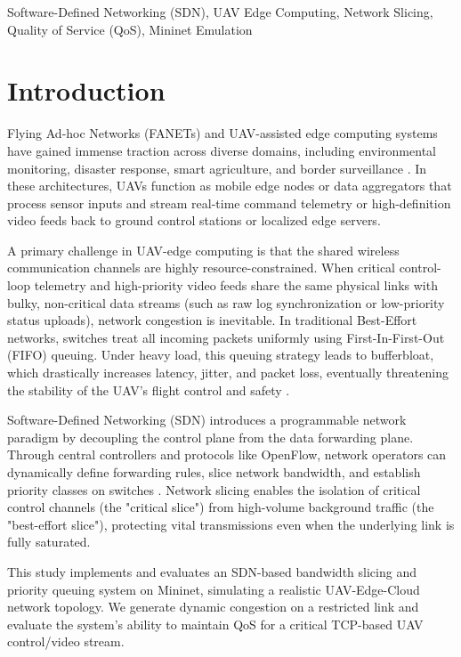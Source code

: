 \documentclass[conference]{IEEEtran}
\begin{document}
\begin{IEEEkeywords}
Software-Defined Networking (SDN), UAV Edge Computing, Network Slicing, Quality of Service (QoS), Mininet Emulation
\end{IEEEkeywords}

\section{Introduction}
Flying Ad-hoc Networks (FANETs) and UAV-assisted edge computing systems have gained immense traction across diverse domains, including environmental monitoring, disaster response, smart agriculture, and border surveillance \cite{b7}. In these architectures, UAVs function as mobile edge nodes or data aggregators that process sensor inputs and stream real-time command telemetry or high-definition video feeds back to ground control stations or localized edge servers.

A primary challenge in UAV-edge computing is that the shared wireless communication channels are highly resource-constrained. When critical control-loop telemetry and high-priority video feeds share the same physical links with bulky, non-critical data streams (such as raw log synchronization or low-priority status uploads), network congestion is inevitable. In traditional Best-Effort networks, switches treat all incoming packets uniformly using First-In-First-Out (FIFO) queuing. Under heavy load, this queuing strategy leads to bufferbloat, which drastically increases latency, jitter, and packet loss, eventually threatening the stability of the UAV's flight control and safety \cite{b1}.

Software-Defined Networking (SDN) introduces a programmable network paradigm by decoupling the control plane from the data forwarding plane. Through central controllers and protocols like OpenFlow, network operators can dynamically define forwarding rules, slice network bandwidth, and establish priority classes on switches \cite{b2}. Network slicing enables the isolation of critical control channels (the "critical slice") from high-volume background traffic (the "best-effort slice"), protecting vital transmissions even when the underlying link is fully saturated.

This study implements and evaluates an SDN-based bandwidth slicing and priority queuing system on Mininet, simulating a realistic UAV-Edge-Cloud network topology. We generate dynamic congestion on a restricted link and evaluate the system's ability to maintain QoS for a critical TCP-based UAV control/video stream.
\end{document}
